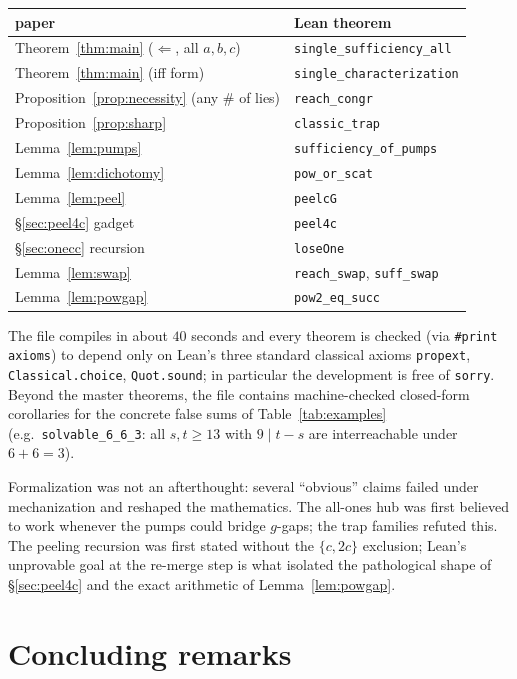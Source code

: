 \documentclass[11pt]{article}
\theoremstyle{definition}
\theoremstyle{remark}
\begin{document}
\begin{center}
\small
\begin{tabular}{ll}
\toprule
paper & Lean theorem \\
\midrule
Theorem~\ref{thm:main} ($\Leftarrow$, all $a,b,c$) & \texttt{single\_sufficiency\_all} \\
Theorem~\ref{thm:main} (iff form) & \texttt{single\_characterization} \\
Proposition~\ref{prop:necessity} (any \# of lies) & \texttt{reach\_congr} \\
Proposition~\ref{prop:sharp} & \texttt{classic\_trap} \\
Lemma~\ref{lem:pumps} & \texttt{sufficiency\_of\_pumps} \\
Lemma~\ref{lem:dichotomy} & \texttt{pow\_or\_scat} \\
Lemma~\ref{lem:peel} & \texttt{peelcG} \\
\S\ref{sec:peel4c} gadget & \texttt{peel4c} \\
\S\ref{sec:onecc} recursion & \texttt{loseOne} \\
Lemma~\ref{lem:swap} & \texttt{reach\_swap}, \texttt{suff\_swap} \\
Lemma~\ref{lem:powgap} & \texttt{pow2\_eq\_succ} \\
\bottomrule
\end{tabular}
\end{center}

The file compiles in about $40$ seconds and every theorem is checked (via
\texttt{\#print axioms}) to depend only on Lean's three standard classical
axioms \texttt{propext}, \texttt{Classical.choice}, \texttt{Quot.sound}; in
particular the development is free of \texttt{sorry}.  Beyond the master
theorems, the file contains machine-checked closed-form corollaries for the
concrete false sums of Table~\ref{tab:examples} (e.g.\
\texttt{solvable\_6\_6\_3}: all $s,t\ge13$ with $9\mid t-s$ are
interreachable under $6+6=3$).

Formalization was not an afterthought: several ``obvious'' claims failed
under mechanization and reshaped the mathematics.  The all-ones hub was
first believed to work whenever the pumps could bridge $g$-gaps; the trap
families refuted this.  The peeling recursion was first stated without the
$\{c,2c\}$ exclusion; Lean's unprovable goal at the re-merge step is what
isolated the pathological shape of \S\ref{sec:peel4c} and the exact
arithmetic of Lemma~\ref{lem:powgap}.

\section{Concluding remarks}\label{sec:conclusion}
\end{document}

